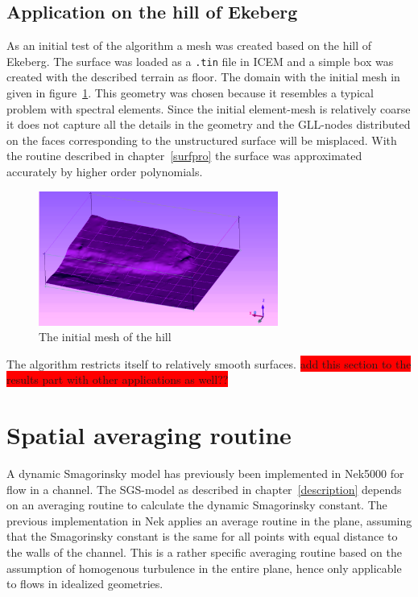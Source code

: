 \subsection{Application on the hill of Ekeberg}
As an initial test of the algorithm a mesh was created based on the hill of Ekeberg.
The surface was loaded as a \verb|.tin| file in ICEM and a simple box was created with 
the described terrain as floor. The domain with the initial mesh in given in 
figure~\ref{fig:ekeberg}. This geometry was chosen because it resembles a typical problem with 
spectral elements. Since the initial element-mesh is relatively coarse it does not capture all 
the details in the geometry and the GLL-nodes distributed on the faces corresponding to the 
unstructured surface will be misplaced. 
With the routine described in chapter~\ref{surfpro} the surface was approximated accurately by higher order polynomials.
%
\begin{figure}[t]
    \centering
	\includegraphics[width=0.7\textwidth]{Figures/mesh_ekebergaasen2.png}
    \caption{The initial mesh of the hill}
	\label{fig:ekeberg}
\end{figure}
%
The algorithm restricts itself to relatively smooth surfaces.
\colorbox{red}{add this section to the results part with other applications as well??}
\section{Spatial averaging routine}
A dynamic Smagorinsky model has previously been implemented in Nek5000 for flow in a channel. 
The SGS-model as described in chapter~\ref{description} depends on an averaging routine to calculate
the dynamic Smagorinsky constant. The previous implementation in Nek applies an average routine in the plane,
assuming that the Smagorinsky constant is the same for all points with equal distance to the walls 
of the channel. This is a rather specific averaging routine based on the assumption of homogenous turbulence 
in the entire plane, hence only applicable to flows in idealized geometries.

